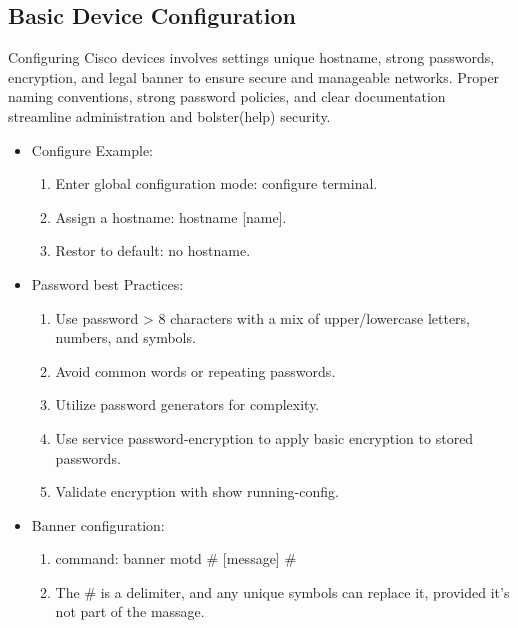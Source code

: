 \documentclass[a4paper,11pt]{article}
\begin{document}
\subsection{Basic Device Configuration}
Configuring Cisco devices involves settings unique hostname, strong passwords, encryption, and legal banner to ensure secure and manageable networks. Proper naming conventions, strong password policies, and clear documentation streamline administration and bolster(help) security.\\
\begin{itemize}
    \item Configure Example:\\
    \begin{enumerate}
        \item Enter global configuration mode: configure terminal.\\
        \item Assign a hostname: hostname [name].\\
        \item Restor to default: no hostname.\\
    \end{enumerate}
    \item Password best Practices:\\
    \begin{enumerate}
        \item Use password > 8 characters with a mix of upper/lowercase letters, numbers, and symbols.\\
        \item Avoid common words or repeating passwords.\\
        \item Utilize password generators for complexity.\\
        \item Use service password-encryption to apply basic encryption to stored passwords.\\
        \item Validate encryption with show running-config.\\
    \end{enumerate}
    \item Banner configuration:\\
    \begin{enumerate}
        \item command: banner motd \# [message] \#\\
        \item The \# is a delimiter, and any unique symbols can replace it, provided it's not part of the massage.\\
    \end{enumerate}
\end{itemize}
\end{document}
